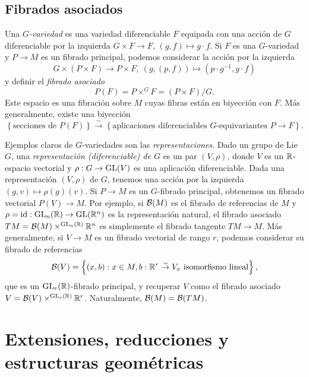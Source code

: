 \documentclass[11pt,a4paper]{amsbook}
\theoremstyle{remark} \newtheorem{rmk}[subsection]{Observación}
\theoremstyle{definition} \newtheorem{defn}[subsection]{Definición}
\theoremstyle{definition} \newtheorem{ex}[subsection]{Ejemplo}
\theoremstyle{definition} \newtheorem{ej}[subsection]{Ejercicio}
\begin{document}
\subsection{Fibrados asociados} Una \emph{$G$-variedad} es una variedad diferenciable $F$ equipada con una acción de $G$ diferenciable por la izquierda $G\times F\rightarrow F$, $(g,f)\mapsto g\cdot f$. Si $F$ es una $G$-variedad y $P\rightarrow M$ es un fibrado principal, podemos considerar la acción por la izquierda
\begin{equation*}
G \times (P\times F) \rightarrow P\times F, \ (g,(p,f)) \mapsto (p\cdot g^{-1}, g \cdot f)
\end{equation*}
y definir el \emph{fibrado asociado}
\begin{equation*}
P(F) = P \times^G F = (P\times F) / G.
\end{equation*}
Este espacio es una fibración sobre $M$ cuyas fibras están en biyección con $F$. Más generalmente, existe una biyección
\begin{equation*}
\left\{ \text{secciones de }P(F) \right\} \overset{\sim}{\longrightarrow} \left\{ \text{aplicaciones diferenciables } G\text{-equivariantes } P\rightarrow F \right\}.
\end{equation*}

Ejemplos claros de $G$-variedades son las \emph{representaciones}. Dado un grupo de Lie $G$, una \emph{representación (diferenciable) de $G$} es un par $(V,\rho)$, donde $V$ es un $\mathbb R$-espacio vectorial y $\rho:G\rightarrow \operatorname{GL}(V)$ es una aplicación diferenciable. Dada una representación $(V,\rho)$ de $G$, tenemos una acción por la izquierda $(g,v)\mapsto \rho(g)(v)$. Si $P\rightarrow M$ es un $G$-fibrado principal, obtenemos un fibrado vectorial $P(V)\rightarrow M$. Por ejemplo, si $\mathcal B(M)$ es el fibrado de referencias de $M$ y $\rho=\mathrm{id}: \operatorname{GL}_n(\mathbb R)\rightarrow \operatorname{GL}(\mathbb R^n)$ es la representación natural, el fibrado asociado $TM=\mathcal B(M) \times^{\operatorname{GL}_n(\mathbb R)} \mathbb R^n$ es simplemente el fibrado tangente $TM\rightarrow M$. Más generalmente, si $V\rightarrow M$ es un fibrado vectorial de rango $r$, podemos considerar su fibrado de referencias
\begin{equation*}
\mathcal B(V) = \left\{ (x,b): x\in M, b:\mathbb R^r \overset{\sim}{\rightarrow} V_x \text{ isomorfismo lineal} \right\},
\end{equation*}
que es un $\operatorname{GL}_r(\mathbb R)$-fibrado principal, y recuperar $V$ como el fibrado asociado $V=\mathcal B(V)\times^{\operatorname{GL}_r(\mathbb R)}\mathbb R^r$. Naturalmente, $\mathcal B(M)=\mathcal B(TM)$.

\section{Extensiones, reducciones y estructuras geométricas}
\end{document}
